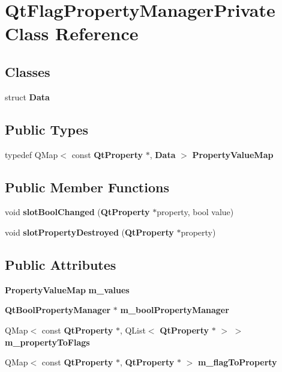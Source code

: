 \section{Qt\+Flag\+Property\+Manager\+Private Class Reference}
\label{classQtFlagPropertyManagerPrivate}
\subsection*{Classes}
\begin{DoxyCompactItemize}
\item 
struct {\bf Data}
\end{DoxyCompactItemize}
\subsection*{Public Types}
\begin{DoxyCompactItemize}
\item 
typedef Q\+Map$<$ const {\bf Qt\+Property} $\ast$, {\bf Data} $>$ {\bf Property\+Value\+Map}
\end{DoxyCompactItemize}
\subsection*{Public Member Functions}
\begin{DoxyCompactItemize}
\item 
void {\bf slot\+Bool\+Changed} ({\bf Qt\+Property} $\ast$property, bool value)
\item 
void {\bf slot\+Property\+Destroyed} ({\bf Qt\+Property} $\ast$property)
\end{DoxyCompactItemize}
\subsection*{Public Attributes}
\begin{DoxyCompactItemize}
\item 
{\bf Property\+Value\+Map} {\bf m\+\_\+values}
\item 
{\bf Qt\+Bool\+Property\+Manager} $\ast$ {\bf m\+\_\+bool\+Property\+Manager}
\item 
Q\+Map$<$ const {\bf Qt\+Property} $\ast$, Q\+List$<$ {\bf Qt\+Property} $\ast$ $>$ $>$ {\bf m\+\_\+property\+To\+Flags}
\item 
Q\+Map$<$ const {\bf Qt\+Property} $\ast$, {\bf Qt\+Property} $\ast$ $>$ {\bf m\+\_\+flag\+To\+Property}
\end{DoxyCompactItemize}



